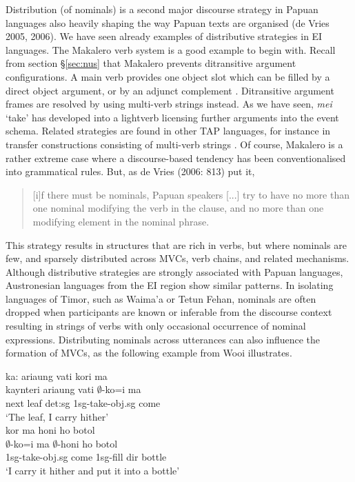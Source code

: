 Distribution (of nominals) is a second major discourse strategy in Papuan languages also heavily shaping the way Papuan texts are organised (de Vries 2005, 2006). We have seen already examples of distributive strategies in EI languages. The Makalero verb system is a good example to begin with. Recall from section §\ref{sec:nus} that Makalero prevents ditransitive argument configurations. A main verb provides one object slot which can be filled by a direct object argument, or by an adjunct complement \parencite{huber2011}. Ditransitive argument frames are resolved by using multi-verb strings instead. As we have seen, \textit{mei} `take' has developed into a lightverb licensing further arguments into the event schema. Related strategies are found in other TAP languages, for instance in transfer constructions consisting of multi-verb strings \parencite{klamer2012development}. Of course, Makalero is a rather extreme case where a discourse-based tendency has been conventionalised into grammatical rules. But, as de Vries (2006: 813) put it, \begin{quote}[i]f there must be nominals, Papuan speakers [...] try to have no more than one nominal modifying the verb in the clause, and no more than one modifying element in the nominal phrase.\end{quote} This strategy results in structures that are rich in verbs, but where nominals are few, and sparsely distributed across MVCs, verb chains, and related mechanisms. Although distributive strategies are strongly associated with Papuan languages, Austronesian languages from the EI region show similar patterns. In isolating languages of Timor, such as Waima'a or Tetun Fehan, nominals are often dropped when participants are known or inferable from the discourse context resulting in strings of verbs with only occasional occurrence of nominal expressions. Distributing nominals across utterances can also influence the formation of MVCs, as the following example from Wooi illustrates.

\pex \label{Wooi_leaf}
\a
\gll ka: ariaung vati kori ma \\
kaynteri ariaung vati $\emptyset$-ko=i ma \\
\glc next leaf \acs{det}:\acs{sg} \acs{1}\acs{sg}-take-\acs{obj}.\acs{sg} come \\
\glft `The leaf, I carry hither' \\ 
\z
\a
\gll kor ma honi ho botol \\
$\emptyset$-ko=i ma $\emptyset$-honi ho botol \\
\glc \acs{1}\acs{sg}-take-\acs{obj}.\acs{sg} come \acs{1}\acs{sg}-fill \acs{dir} bottle \\
\glft `I carry it hither and put it into a bottle' \\
\z
\xe

